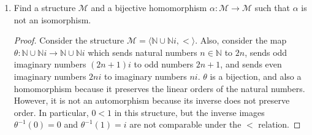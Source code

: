\documentclass{article}
\begin{document}
\begin{enumerate}
    \begin{proof}
      $\mathcal{M}=\langle\mathbb{N},<\rangle$ is one such structure. Let
      $\alpha:\mathbb{N}\rightarrow\mathbb{N}$ be an automorphism. We show by
      induction on $n\in\mathbb{N}$ that $\alpha(n)=n$. For the base case,
      if $\alpha(0)=k>0$, then since automorphisms preserve relations, and
      $k-1<k$, we have $\alpha^{-1}(k-1)<\alpha^{-1}(k)=0$, which is not
      possible because nothing in $\mathbb{N}$ is smaller than $0$. Hence
      $\alpha(0)=0$. For the inductive step, assume $\alpha(k)=k$ for
      $k\leq n\in\mathbb{N}$. If $\alpha(n+1)=n+1+k$ for some $k>0$, then
      from $n+1<n+1+k$, we get, from the preservation of relations, that
      $\alpha^{-1}(n+1)<\alpha^{-1}(n+1+k)=n+1$. Yet $\alpha^{-1}(n+1)$
      must be greater than $n+1$ from inductive hypothesis, which is a
      contradiction. Hence $\alpha(n+1)=n+1$ as required, and $\alpha$ can
      only be the identity map.
    \end{proof}

  \item Find a structure $\mathcal{M}$ and a bijective homomorphism
    $\alpha:\mathcal{M}\rightarrow\mathcal{M}$ such that $\alpha$ is not an
    isomorphism.

    \begin{proof}
      Consider the structure
      $\mathcal{M}=\langle\mathbb{N}\cup\mathbb{N}i,<\rangle$. Also,
      consider the map
      $\theta:\mathbb{N}\cup\mathbb{N}i\rightarrow\mathbb{N}\cup\mathbb{N}i$
      which sends natural numbers $n\in\mathbb{N}$ to $2n$, sends odd
      imaginary numbers $(2n+1)i$ to odd numbers $2n+1$, and sends even
      imaginary numbers $2ni$ to imaginary numbers $ni$. $\theta$ is a
      bijection, and also a homomorphism because it preserves the linear
      orders of the natural numbers. However, it is not an automorphism
      because its inverse does not preserve order. In particular, $0<1$ in
      this structure, but the inverse images $\theta^{-1}(0)=0$ and
      $\theta^{-1}(1)=i$ are not comparable under the $<$ relation.
    \end{proof}
\end{enumerate}
\end{document}
